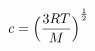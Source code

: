 \begin{eqnarray*}
c =
{
    \Bigl(
        \frac{3 RT}{M}
    \Bigr) 
}^{\frac{1}{2}} 
\label{}
\end{eqnarray*}
